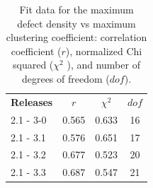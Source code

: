     \begin{table}
    \centering
      \begin{tabular}{|l|c|c|c|}
      \hline
      \textbf{Releases} & $r$ & $\chi^2$ & $dof$  \\
      2.1 - 3-0 & 0.565 & 0.633 & 16  \\
      2.1 - 3.1 & 0.576 & 0.651  & 17  \\
      2.1 - 3.2 & 0.677 & 0.523 & 20 \\ 
      2.1 - 3.3 & 0.687 & 0.547 & 21 \\
      \hline
      \end{tabular}
       \caption{Fit data for the maximum defect density vs maximum clustering coefficient: correlation coefficient ($r$), 
      normalized Chi squared ($\chi^2$ ), and number of degrees of freedom ($dof$).}
\label{tab:max_abn-vs-maxcc}      
\end{table}
  
